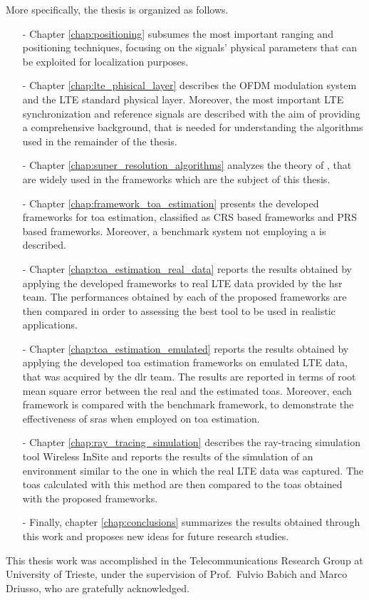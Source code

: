 More specifically, the thesis is organized as follows.
\begin{itemize}
\item[-] Chapter \ref{chap:positioning} subsumes the most important ranging and positioning techniques, 
focusing on the signals' physical parameters that can be exploited for localization purposes.
\item[-] Chapter \ref{chap:lte_phisical_layer} describes the OFDM modulation system and the LTE 
standard physical layer. Moreover, the most important LTE synchronization and reference signals are 
described with the aim of providing a comprehensive background, that is needed for understanding the 
algorithms used in the remainder of the thesis. 
\item[-] Chapter \ref{chap:super_resolution_algorithms} analyzes the theory of , 
that are widely used in the frameworks which are the subject of this thesis.
\item[-] Chapter \ref{chap:framework_toa_estimation} presents the developed frameworks 
for \gls{toa} estimation, classified as CRS based frameworks and PRS based frameworks. 
Moreover, a benchmark system not employing a  is described.
\item[-] Chapter \ref{chap:toa_estimation_real_data} reports the results obtained by applying  
the developed frameworks to real LTE data provided by the \gls{hsr} team. The performances 
obtained by each of the proposed frameworks are then compared in order to assessing 
the best tool to be used in realistic applications.
\item[-] Chapter \ref{chap:toa_estimation_emulated} reports the results obtained by applying the 
developed \gls{toa} estimation frameworks on emulated LTE data, that was acquired by the \gls{dlr} team. 
The results are reported in terms of root mean square error between the real and the estimated 
\glspl{toa}. Moreover, each framework is compared with the benchmark framework, 
to demonstrate the effectiveness of \glspl{sra} when employed on \gls{toa} estimation.
\item[-] Chapter \ref{chap:ray_tracing_simulation} describes the ray-tracing simulation tool 
Wireless InSite and reports the results of the simulation of an environment similar to the one
in which the real LTE data was captured. The \glspl{toa} calculated with this method are then 
compared to the \glspl{toa} obtained with the proposed frameworks.
\item[-] Finally, chapter \ref{chap:conclusions} summarizes the results obtained through this work and
proposes new ideas for future research studies.
\end{itemize}
This thesis work was accomplished in the Telecommunications Research Group at University of Trieste, 
under the supervision of Prof.~Fulvio Babich and Marco Driusso, who are gratefully acknowledged.

